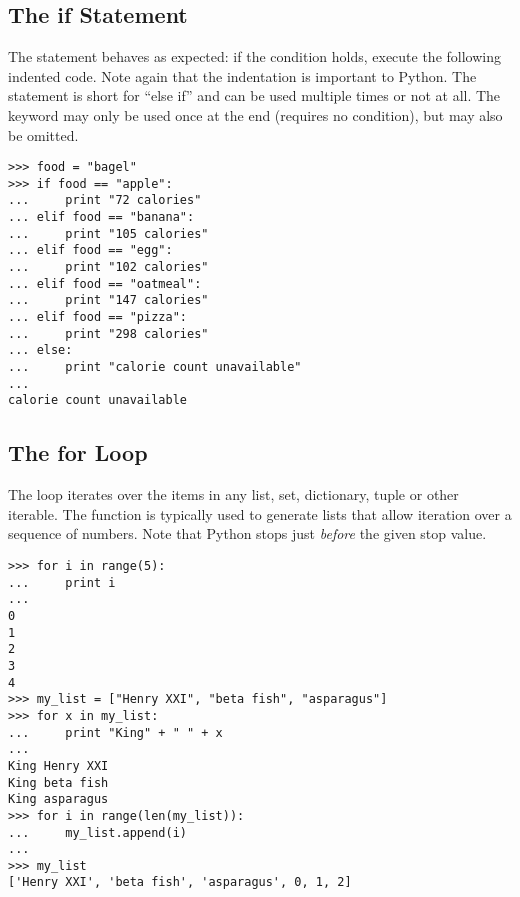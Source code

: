 \subsection*{The if Statement}
\begin{example}
The  statement behaves as expected: if the condition holds, execute the 
following indented code. Note again that the indentation is important to Python. 
The  statement is short for ``else if'' and can be used multiple times or not at all. 
The  keyword may only be used once at the end (requires no condition), 
but may also be omitted. 
\begin{lstlisting}
>>> food = "bagel"
>>> if food == "apple":
...     print "72 calories"
... elif food == "banana":
...     print "105 calories"
... elif food == "egg":
...     print "102 calories"
... elif food == "oatmeal":
...     print "147 calories"
... elif food == "pizza":
...     print "298 calories"
... else: 
...     print "calorie count unavailable"
...     
calorie count unavailable
\end{lstlisting}
\end{example}

\subsection*{The for Loop}
\begin{example}
The  loop iterates over the items in any list, set, dictionary, tuple or other iterable. 
The  function is typically used to generate lists that allow iteration 
over a sequence of numbers. Note that Python stops just \emph{before} the given stop value. 

\begin{lstlisting}
>>> for i in range(5):
...     print i
...     
0
1
2
3
4
>>> my_list = ["Henry XXI", "beta fish", "asparagus"]
>>> for x in my_list:
...     print "King" + " " + x
...     
King Henry XXI
King beta fish
King asparagus
>>> for i in range(len(my_list)):
...     my_list.append(i)
...     
>>> my_list
['Henry XXI', 'beta fish', 'asparagus', 0, 1, 2]
\end{lstlisting}
\end{example}


